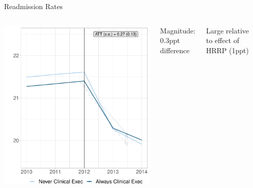 \documentclass[notes,11pt, aspectratio=169]{beamer}
\newenvironment{wideitemize}{\itemize\addtolength{\itemsep}{10pt}}{\enditemize}
\begin{document}
\begin{frame}{Readmission Rates}\label{main:readrates}
\large
    \begin{columns}
        \centering
        \includegraphics[width=.9\textwidth]{Objects/read_md_nomd_synth_graph.pdf}
        \begin{wideitemize}
            \item Magnitude: 0.3ppt difference

\vspace{5mm}
            
            \item Large relative to effect of HRRP (1ppt)
        \end{wideitemize}
        
        \vspace{20mm}

        \hyperlink{int_margin}{}
        \hyperlink{cmi}{}
        \hyperlink{specifications}{}
        \hyperlink{specialty}{}
        
    \end{columns}
\end{frame}
\end{document}
